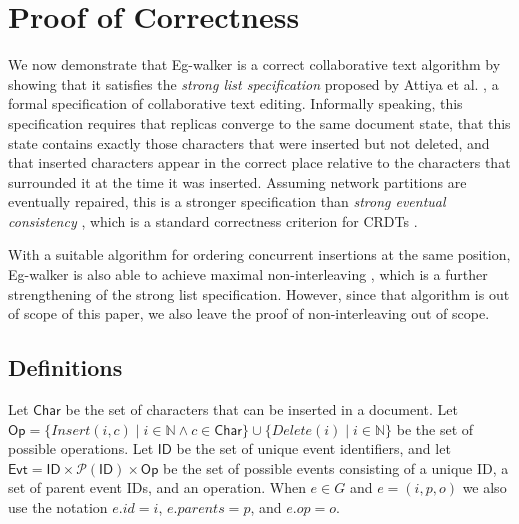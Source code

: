 \documentclass[sigplan,10pt]{acmart}
\newcommand{\algname}{Eg-walker\xspace}
\begin{document}
\section{Proof of Correctness}\label{proofs}

We now demonstrate that \algname is a correct collaborative text algorithm by showing that it satisfies the \emph{strong list specification} proposed by Attiya et al. \cite{Attiya2016}, a formal specification of collaborative text editing.
Informally speaking, this specification requires that replicas converge to the same document state, that this state contains exactly those characters that were inserted but not deleted, and that inserted characters appear in the correct place relative to the characters that surrounded it at the time it was inserted.
Assuming network partitions are eventually repaired, this is a stronger specification than \emph{strong eventual consistency} \cite{Shapiro2011}, which is a standard correctness criterion for CRDTs \cite{Gomes2017verifying}.

With a suitable algorithm for ordering concurrent insertions at the same position, \algname is also able to achieve maximal non-interleaving \cite{fugue}, which is a further strengthening of the strong list specification.
However, since that algorithm is out of scope of this paper, we also leave the proof of non-interleaving out of scope.

\subsection{Definitions}

Let $\mathsf{Char}$ be the set of characters that can be inserted in a document.
Let $\mathsf{Op} = \{\mathit{Insert}(i, c) \mid i \in \mathbb{N} \wedge c \in \mathsf{Char}\} \cup \{\mathit{Delete}(i) \mid i \in \mathbb{N}\}$ be the set of possible operations.
Let $\mathsf{ID}$ be the set of unique event identifiers, and let $\mathsf{Evt} = \mathsf{ID} \times \mathcal{P}(\mathsf{ID}) \times \mathsf{Op}$ be the set of possible events consisting of a unique ID, a set of parent event IDs, and an operation.
When $e \in G$ and $e = (i,p,o)$ we also use the notation $e.\mathit{id} = i$, $e.\mathit{parents} = p$, and $e.\mathit{op} = o$.
\end{document}
